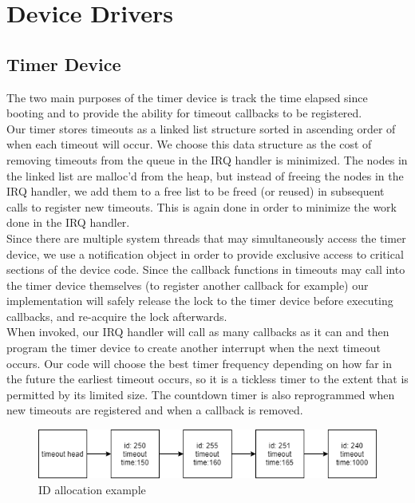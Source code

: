\section{Device Drivers}

\subsection{Timer Device}


\noindent
The two main purposes of the timer device is track the time
elapsed since booting and to provide the ability for timeout
callbacks to be registered. 
\\

\noindent
Our timer stores timeouts as a
linked list structure sorted in ascending order of when each
timeout will occur. We choose this data structure as the cost
of removing timeouts from the queue in the IRQ handler is
minimized. The nodes in the linked list are malloc'd from the
heap, but instead of freeing the nodes in the IRQ handler, 
we add them to a free list to be freed (or reused) in subsequent
calls to register new timeouts. This is again done in order to 
minimize the work done in the IRQ handler.
\\

\noindent
Since there are multiple system threads that may simultaneously
access the timer device, we use a notification object in order
to provide exclusive access to critical sections of the device code. Since
the callback functions in timeouts may call into the timer device
themselves (to register another callback for example) our implementation
will safely release the lock to the timer device before executing callbacks,
and re-acquire the lock afterwards.
\\

\noindent
When invoked, our IRQ handler will call as many callbacks as it can
and then program the timer device to create another interrupt when 
the next timeout occurs. Our code will choose the best timer frequency
depending on how far in the future the earliest timeout occurs, so it
is a tickless timer to the extent that is permitted by its limited size. 
The countdown timer is also reprogrammed when new timeouts are registered
and when a callback is removed.
\\

\begin{figure}[h]
    \centering
    \includegraphics[width=\linewidth]{id_allocation.png}
    \caption{ID allocation example}
    \label{fig:id_allocation}
\end{figure}

